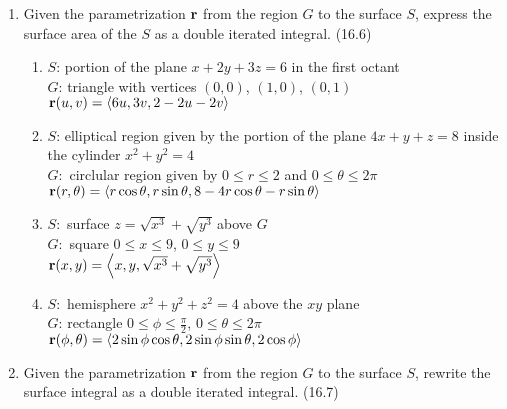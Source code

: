 \begin{enumerate}
    \newpage

    \item Given the parametrization $\mathbf{r}$ from the region $G$ to the surface $S$, express the surface area of the $S$ as a double iterated integral. (16.6)

      \begin{enumerate}
        \item 
          $S$: portion of the plane $x+2y+3z=6$ in the first octant\\
          $G$: triangle with vertices $(0,0)$, $(1,0)$, $(0,1)$\\ 
          $\mathbf{r}(u,v)=\left<6u,3v,2-2u-2v\right>$
        \item
          $S$: elliptical region given by the portion of the plane $4x+y+z=8$ inside the cylinder $x^2+y^2=4$\\
          $G:$ circlular region given by $0\leq r\leq 2$ and $0\leq\theta\leq 2\pi$\\
          $\mathbf{r}(r,\theta)=\left<r\cos\theta,r\sin\theta,8-4r\cos\theta-r\sin\theta\right>$
        \item
          $S:$ surface $z=\sqrt{x^3}+\sqrt{y^3}$ above $G$\\
          $G:$ square $0\leq x\leq 9$, $0\leq y\leq 9$\\
          $\mathbf{r}(x,y)=\left<x,y,\sqrt{x^3}+\sqrt{y^3}\right>$
        \item
          $S:$ hemisphere $x^2+y^2+z^2=4$ above the $xy$ plane\\
          $G$: rectangle $0\leq\phi\leq\frac{\pi}{2}$, $0\leq\theta\leq2\pi$\\
          $\mathbf{r}(\phi,\theta)=\left<2\sin\phi\cos\theta,2\sin\phi\sin\theta,2\cos\phi\right>$
      \end{enumerate}

    \item Given the parametrization $\mathbf{r}$ from the region $G$ to the surface $S$, rewrite the surface integral as a double iterated integral. (16.7)


\end{enumerate}
